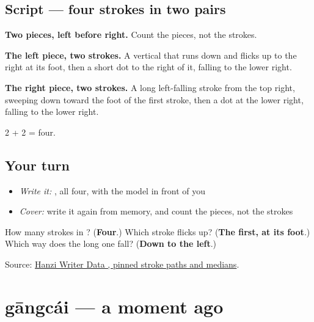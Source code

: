 \subsection*{Script — four strokes in two pairs}

\begin{quote}
\end{quote}

\textbf{Two pieces, left before right.} Count the pieces, not the strokes.

\textbf{The left piece, two strokes.} A vertical that runs down and flicks up to the right at its foot, then a short dot to the right of it, falling to the lower right.

\textbf{The right piece, two strokes.} A long left-falling stroke from the top right, sweeping down toward the foot of the first stroke, then a dot at the lower right, falling to the lower right.

2 + 2 = four.

\subsection*{Your turn}
\begin{itemize}
\raggedright
  \item \emph{Write it:} , all four, with the model in front of you
  \item \emph{Cover:} write it again from memory, and count the pieces, not the strokes
\end{itemize}

\begin{tcolorbox}[breakable,colback=teal!4,colframe=teal!35!black,title={Before you move on}]
How many strokes in ? (\textbf{Four}.) Which stroke flicks up? (\textbf{The first, at its foot}.) Which way does the long one fall? (\textbf{Down to the left}.)

Source: \href{https://raw.githubusercontent.com/chanind/hanzi-writer-data/68d10a4b21150cae5e1ebbd223eed289cf32d90c/data/\%E4\%BB\%A5.json}{Hanzi Writer Data , pinned stroke paths and medians}.
\end{tcolorbox}
\section[gāngcái]{gāngcái — a moment ago}

\label{lesson:ZH-C126-gangcai}



